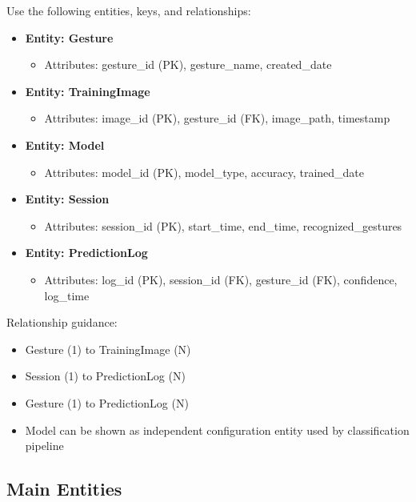 Use the following entities, keys, and relationships:
\begin{itemize}
    \item \textbf{Entity: Gesture}
    \begin{itemize}
        \item Attributes: gesture\_id (PK), gesture\_name, created\_date
    \end{itemize}
    \item \textbf{Entity: TrainingImage}
    \begin{itemize}
        \item Attributes: image\_id (PK), gesture\_id (FK), image\_path, timestamp
    \end{itemize}
    \item \textbf{Entity: Model}
    \begin{itemize}
        \item Attributes: model\_id (PK), model\_type, accuracy, trained\_date
    \end{itemize}
    \item \textbf{Entity: Session}
    \begin{itemize}
        \item Attributes: session\_id (PK), start\_time, end\_time, recognized\_gestures
    \end{itemize}
    \item \textbf{Entity: PredictionLog}
    \begin{itemize}
        \item Attributes: log\_id (PK), session\_id (FK), gesture\_id (FK), confidence, log\_time
    \end{itemize}
\end{itemize}

Relationship guidance:
\begin{itemize}
    \item Gesture (1) to TrainingImage (N)
    \item Session (1) to PredictionLog (N)
    \item Gesture (1) to PredictionLog (N)
    \item Model can be shown as independent configuration entity used by classification pipeline
\end{itemize}

\subsection{Main Entities}

